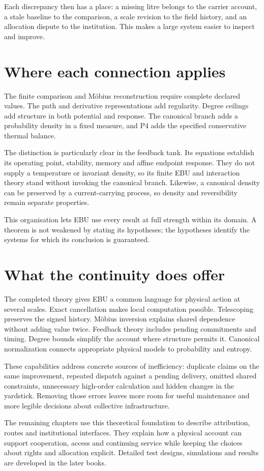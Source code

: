 Each discrepancy then has a place: a missing litre belongs to the carrier account, a stale baseline to the comparison, a scale revision to the field history, and an allocation dispute to the institution. This makes a large system easier to inspect and improve.

\section{Where each connection applies}
The finite comparison and Möbius reconstruction require complete declared values. The path and derivative representations add regularity. Degree ceilings add structure in both potential and response. The canonical branch adds a probability density in a fixed measure, and P4 adds the specified conservative thermal balance.

The distinction is particularly clear in the feedback tank. Its equations establish its operating point, stability, memory and affine endpoint response. They do not supply a temperature or invariant density, so its finite EBU and interaction theory stand without invoking the canonical branch. Likewise, a canonical density can be preserved by a current-carrying process, so density and reversibility remain separate properties.

This organisation lets EBU use every result at full strength within its domain. A theorem is not weakened by stating its hypotheses; the hypotheses identify the systems for which its conclusion is guaranteed.

\section{What the continuity does offer}
The completed theory gives EBU a common language for physical action at several scales. Exact cancellation makes local computation possible. Telescoping preserves the signed history. Möbius inversion explains shared dependence without adding value twice. Feedback theory includes pending commitments and timing. Degree bounds simplify the account where structure permits it. Canonical normalization connects appropriate physical models to probability and entropy.

These capabilities address concrete sources of inefficiency: duplicate claims on the same improvement, repeated dispatch against a pending delivery, omitted shared constraints, unnecessary high-order calculation and hidden changes in the yardstick. Removing those errors leaves more room for useful maintenance and more legible decisions about collective infrastructure.

The remaining chapters use this theoretical foundation to describe attribution, routes and institutional interfaces. They explain how a physical account can support cooperation, access and continuing service while keeping the choices about rights and allocation explicit. Detailed test designs, simulations and results are developed in the later books.
